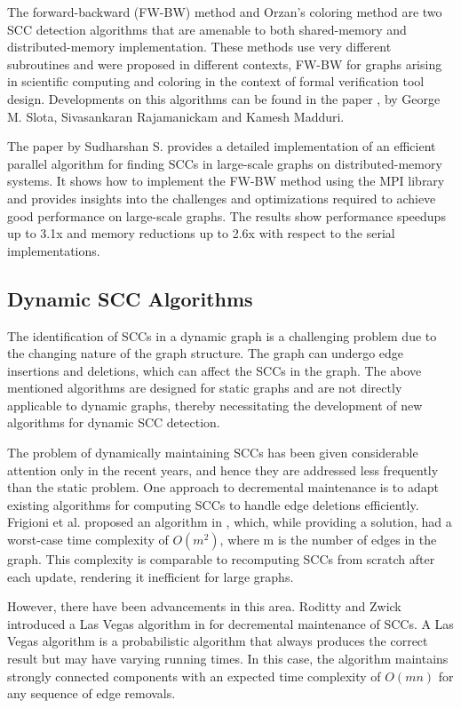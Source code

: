 The forward-backward (FW-BW) method \cite{10.1007/3-540-45591-4_68} and Orzan's coloring method \cite{article} are two SCC detection algorithms that are amenable to both shared-memory and distributed-memory implementation.
These methods use very different subroutines and were proposed in different contexts, FW-BW for graphs arising in scientific computing and coloring in the context of formal verification tool design.
Developments on this algorithms can be found in the paper \cite{6877288}, by George M. Slota, Sivasankaran Rajamanickam and Kamesh Madduri.

The paper by Sudharshan S. \cite{implementation} provides a detailed implementation of an efficient parallel algorithm for finding SCCs in large-scale graphs on distributed-memory systems.
It shows how to implement the FW-BW method using the MPI library and provides insights into the challenges and optimizations required to achieve good performance on large-scale graphs.
The results show performance speedups up to 3.1x and memory reductions up to 2.6x with respect to the serial implementations.

\subsection{Dynamic SCC Algorithms} \label{SubSec: Dynamic SCC Algorithms}

The identification of SCCs in a dynamic graph is a challenging problem due to the changing nature of the graph structure.
The graph can undergo edge insertions and deletions, which can affect the SCCs in the graph.
The above mentioned algorithms are designed for static graphs and are not directly applicable to dynamic graphs, thereby necessitating the development of new algorithms for dynamic SCC detection.

The problem of dynamically maintaining SCCs has been given considerable attention only in the recent years, and hence they are addressed less frequently than the static problem.
One approach to decremental maintenance is to adapt existing algorithms for computing SCCs to handle edge deletions efficiently. Frigioni et al. proposed an algorithm in \cite[2001]{article2001}, which, while providing a solution, had a worst-case time complexity of 
$O(m^2)$, where m is the number of edges in the graph. This complexity is comparable to recomputing SCCs from scratch after each update, rendering it inefficient for large graphs.

However, there have been advancements in this area. Roditty and Zwick introduced a Las Vegas algorithm in \cite{article2002} for decremental maintenance of SCCs. A Las Vegas algorithm is a probabilistic algorithm that always produces the correct result but may have varying running times. In this case, the algorithm maintains strongly connected components with an expected time complexity of 
$O(mn)$ for any sequence of edge removals.

